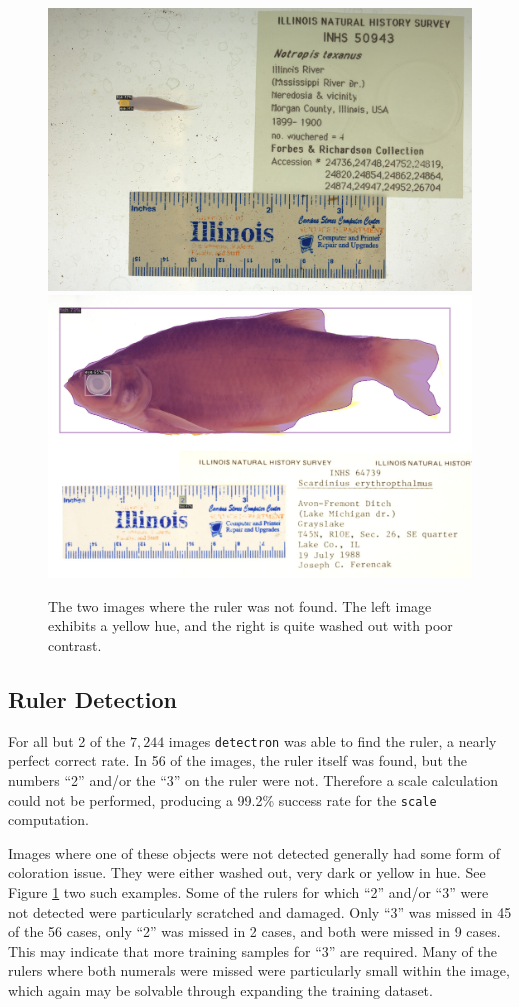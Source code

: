 \documentclass[conference]{IEEEtran}
\begin{document}
\begin{figure}[H]
  \centering
  \includegraphics[width=0.49\linewidth]{images/no_ruler1}
  \includegraphics[width=0.49\linewidth]{images/no_ruler2}
  \caption{The two images where the ruler was not found. The left image exhibits a yellow hue, and the right is quite washed out with poor contrast.}
  \label{fig:no_ruler}
\end{figure}


\subsection{Ruler Detection}
For all but 2 of the \(7,244\) images \verb|detectron| was able to find the ruler, a nearly perfect correct rate.
In 56 of the images, the ruler itself was found, but the numbers ``2''
and/or the ``3'' on the ruler were not. Therefore a scale calculation could
not be performed, producing a 99.2\% success rate for
the \verb|scale| computation.

Images where one of these objects were not detected generally had some form of coloration issue. They were either washed out, very dark or yellow in hue.
See Figure \ref{fig:no_ruler} two such examples.
Some of the rulers for which ``2'' and/or ``3'' were not detected were particularly scratched and damaged. Only ``3'' was missed in 45 of the 56 cases, only ``2'' was missed in 2 cases, and both were missed in 9 cases. This may indicate that more training samples for ``3'' are required. Many of the rulers where both numerals were missed were particularly small within the image, which again may be solvable through expanding the training dataset.
\end{document}
